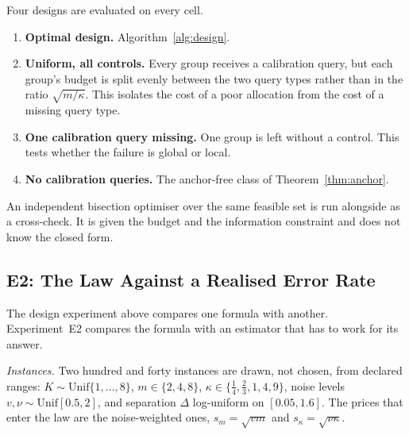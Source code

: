 \documentclass[conference]{IEEEtran}
\theoremstyle{definition}
\begin{document}
Four designs are evaluated on every cell.

\begin{enumerate}
\item[1)] \textbf{Optimal design.} Algorithm~\ref{alg:design}.
\item[2)] \textbf{Uniform, all controls.} Every group receives a calibration query, but each
group's budget is split evenly between the two query types rather than in the ratio
$\sqrt{m/\kappa}$. This isolates the cost of a poor allocation from the cost of a missing
query type.
\item[3)] \textbf{One calibration query missing.} One group is left without a control. This
tests whether the failure is global or local.
\item[4)] \textbf{No calibration queries.} The anchor-free class of Theorem~\ref{thm:anchor}.
\end{enumerate}

An independent bisection optimiser over the same feasible set is run alongside as a
cross-check. It is given the budget and the information constraint and does not know the
closed form.

\subsection{E2: The Law Against a Realised Error Rate}
\label{sec:e2}

The design experiment above compares one formula with another. Experiment~E2 compares the
formula with an estimator that has to work for its answer.

\emph{Instances.} Two hundred and forty instances are drawn, not chosen, from declared
ranges: $K\sim\mathrm{Unif}\{1,\dots,8\}$, $m\in\{2,4,8\}$,
$\kappa\in\{\tfrac14,\tfrac23,1,4,9\}$, noise levels $v,\nu\sim\mathrm{Unif}[0.5,2]$,
and separation $\Delta$ log-uniform on $[0.05,1.6]$. The prices that enter the law are the
noise-weighted ones, $s_{m}=\sqrt{vm}$ and $s_{\kappa}=\sqrt{\nu\kappa}$.
\end{document}
